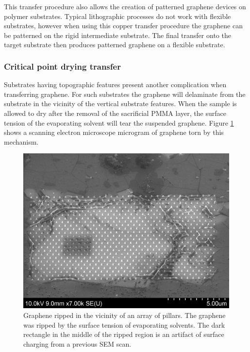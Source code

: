 \documentclass[edeposit,fullpage,draftthesis]{uiucthesis2009}
\begin{document}
        This transfer procedure also allows the creation of patterned graphene devices on polymer substrates.
        Typical lithographic processes do not work with flexible substrates, however when using this
        copper transfer procedure the graphene can be patterned on the rigid intermediate substrate. The
        final transfer onto the target substrate then produces patterned graphene on a flexible substrate.
            
            \subsubsection{Critical point drying transfer}
            
        Substrates having topographic features present another complication when transferring graphene.
        For such substrates the graphene will delaminate from the substrate in the vicinity of the 
        vertical substrate features. When the sample is allowed to dry
        after the removal of the sacrificial PMMA layer, the surface tension of the evaporating solvent will tear
        the suspended graphene. Figure \ref{fig:cpdtear} shows a scanning electron microscope microgram of 
        graphene torn by this mechanism.
        
        \begin{figure}
            \centering
            \includegraphics[width=0.5\linewidth]{images/experimentaltechniques/cpdtear.png}
            \caption[Graphene tears from solvent surface tension]{
                Graphene ripped in the vicinity of an array of pillars. The graphene 
                was ripped by the surface tension
                of evaporating solvents. The dark rectangle in the middle of the ripped region
                is an artifact of surface charging from a previous SEM scan.
                }
            \label{fig:cpdtear}
        \end{figure}
\end{document}
